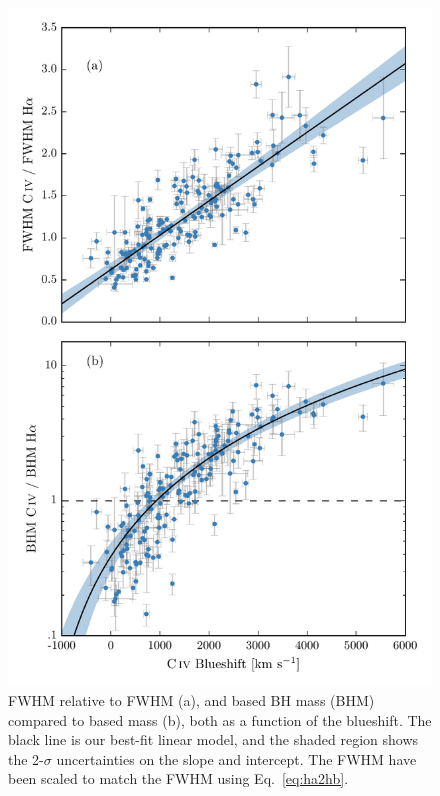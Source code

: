 \begin{figure}
    \includegraphics[width=\textwidth]{figures/chapter03/fwhm_and_bhm_ha.pdf} 
    \caption{ FWHM relative to \ha FWHM (a), and  based BH mass (BHM) compared to \ha based mass (b), both as a function of the  blueshift. The black line is our best-fit linear model, and the shaded region shows the 2-$\sigma$ uncertainties on the slope and intercept. The \ha FWHM have been scaled to match the \hb FWHM using Eq.~\ref{eq:ha2hb}.}  
    \label{fig:correction_ha}
\end{figure}

